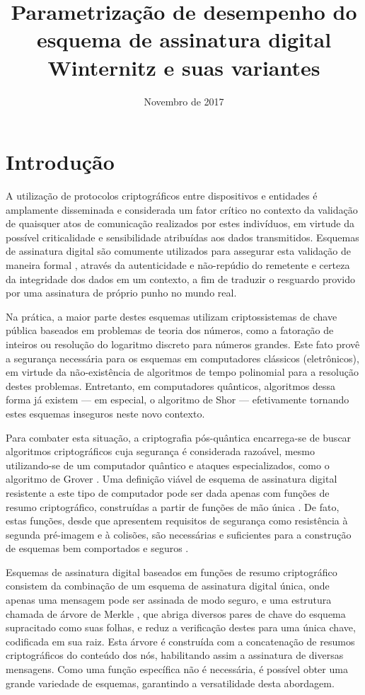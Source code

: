 \documentclass[12pt]{article}
\title{Parametrização de desempenho do esquema de
assinatura digital Winternitz e suas variantes}
\author{Novembro de 2017}
\date{}
\begin{document}
\maketitle

\section{Introdução}

A utilização de protocolos criptográficos entre dispositivos e entidades é
amplamente disseminada e considerada um fator crítico no contexto da validação
de quaisquer atos de comunicação realizados por estes indivíduos, em virtude da
possível criticalidade e sensibilidade atribuídas aos dados transmitidos.
Esquemas de assinatura digital são comumente utilizados para assegurar esta
validação de maneira formal \cite{Goldreich:2004:FCV:975541}, através da
autenticidade e não-repúdio do remetente e certeza da integridade dos dados em
um contexto, a fim de traduzir o resguardo provido por uma assinatura de
próprio punho no mundo real.

Na prática, a maior parte destes esquemas utilizam criptossistemas de chave
pública baseados em problemas de teoria dos números, como a fatoração de
inteiros ou resolução do logaritmo discreto para números grandes. Este fato
provê a segurança necessária para os esquemas em computadores clássicos
(eletrônicos), em virtude da não-existência de algoritmos de tempo polinomial
para a resolução destes problemas. Entretanto, em computadores quânticos,
algoritmos dessa forma já existem --- em especial, o algoritmo de Shor
\cite{Shor:1997:PAP:264393.264406} --- efetivamente tornando estes esquemas
inseguros neste novo contexto. 

Para combater esta situação, a criptografia pós-quântica encarrega-se de buscar
algoritmos criptográficos cuja segurança é considerada razoável, mesmo
utilizando-se de um computador quântico e ataques especializados, como o
algoritmo de Grover \cite{Grover:1996:FQM:237814.237866}. Uma definição viável
de esquema de assinatura digital resistente a este tipo de computador pode ser
dada apenas com funções de resumo criptográfico, construídas a partir de
funções de mão única \cite{cryptoeprint:2005:328}. De fato, estas funções,
desde que apresentem requisitos de segurança como resistência à segunda
pré-imagem e à colisões, são necessárias e suficientes para a construção de
esquemas bem comportados e seguros \cite{Rompel:1990:OFN:100216.100269}.

Esquemas de assinatura digital baseados em funções de resumo criptográfico
consistem da combinação de um esquema de assinatura digital única, onde apenas
uma mensagem pode ser assinada de modo seguro, e uma estrutura chamada de
árvore de Merkle \cite{Merkle:1989:CDS:118209.118230}, que abriga diversos
pares de chave do esquema supracitado como suas folhas, e reduz a verificação
destes para uma única chave, codificada em sua raiz. Esta árvore é construída
com a concatenação de resumos criptográficos do conteúdo dos nós, habilitando
assim a assinatura de diversas mensagens. Como uma função específica não é
necessária, é possível obter uma grande variedade de esquemas, garantindo a
versatilidade desta abordagem.
\end{document}
